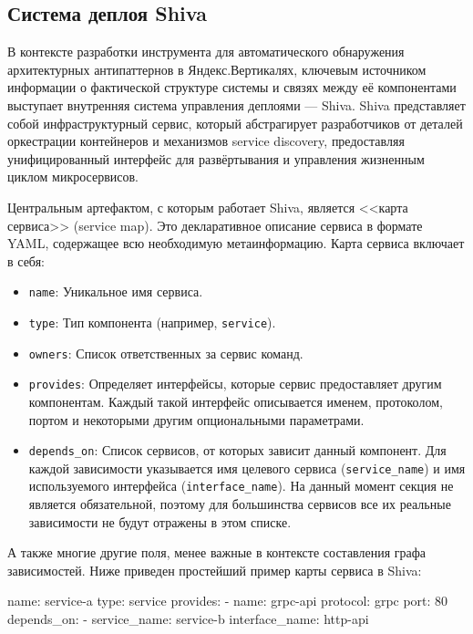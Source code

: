 \subsection{Система деплоя Shiva}

В контексте разработки инструмента для автоматического обнаружения архитектурных антипаттернов в Яндекс.Вертикалях, ключевым источником информации о фактической структуре системы и связях между её компонентами выступает внутренняя система управления деплоями — Shiva. Shiva представляет собой инфраструктурный сервис, который абстрагирует разработчиков от деталей оркестрации контейнеров и механизмов service discovery, предоставляя унифицированный интерфейс для развёртывания и управления жизненным циклом микросервисов.

Центральным артефактом, с которым работает Shiva, является <<карта сервиса>> (service map). Это декларативное описание сервиса в формате YAML, содержащее всю необходимую метаинформацию. Карта сервиса включает в себя:

\begin{itemize}
    \item \verb|name|: Уникальное имя сервиса.
    \item \verb|type|: Тип компонента (например, \verb|service|).
    \item \verb|owners|: Список ответственных за сервис команд.
    \item \verb|provides|: Определяет интерфейсы, которые сервис предоставляет другим компонентам. Каждый такой интерфейс описывается именем, протоколом, портом и некоторыми другим опциональными параметрами.
    \item \verb|depends_on|: Список сервисов, от которых зависит данный компонент. Для каждой зависимости указывается имя целевого сервиса (\verb|service_name|) и имя используемого интерфейса (\verb|interface_name|). На данный момент секция не является обязательной, поэтому для большинства сервисов все их реальные зависимости не будут отражены в этом списке.
\end{itemize}

А также многие другие поля, менее важные в контексте составления графа зависимостей. Ниже приведен простейший пример карты сервиса в Shiva:

\begin{nocode}
name: service-a
type: service
provides:
- name: grpc-api
  protocol: grpc
  port: 80
depends_on:
- service_name: service-b
  interface_name: http-api
\end{nocode}

